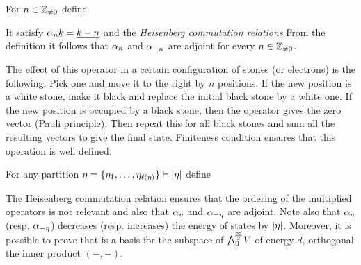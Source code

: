 \documentclass[10pt]{beamer}
\begin{document}
\begin{frame}

\begin{definition}
For $n\in\mathbb Z_{\neq0}$ define\\[-18pt]
\end{definition}

It satisfy $\alpha_n\underline{k}=\underline{k-n}$ and the \emph{Heisenberg commutation relations}
From the definition it follows that $\alpha_n$ and $\alpha_{-n}$ are adjoint for every $n\in\mathbb Z_{\neq0}$.

The effect of this operator in a certain configuration of stones (or electrons) is the following. Pick one and move it to the right by $n$ positions. If the new position is a white stone, make it black and replace the initial black stone by a white one. If the new position is occupied by a black stone, then the operator gives the zero vector (Pauli principle). Then repeat this for all black stones and sum all the resulting vectors to give the final state. Finiteness condition ensures that this operation is well defined. 

\end{frame}

\begin{frame}

\begin{definition}
For any partition $\eta=\{\eta_1,\ldots,\eta_{\ell(\eta)}\}\vdash|\eta|$ define
\end{definition}

The Heisenberg commutation relation ensures that the ordering of the multiplied operators is not relevant and also that $\alpha_\eta$ and $\alpha_{-\eta}$ are adjoint. Note also that $\alpha_{\eta}$ (resp. $\alpha_{-\eta}$) decreases (resp. increases) the energy of states by $|\eta|$. Moreover, it is possible to prove that 
is a basis for the subspace of $\bigwedge^{\!\frac\infty2}_0\!V$ of energy $d$, orthogonal \wrt the inner product $(-,-)$.

\end{frame}

\end{document}
